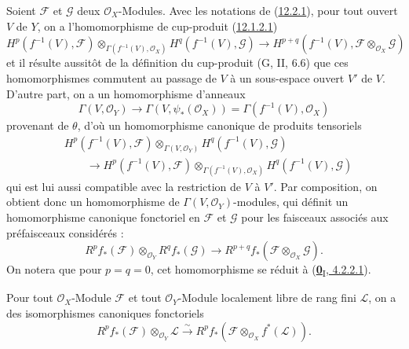\begin{env}[12.2.2]
\label{0.12.2.2-fr}
Soient $\mathcal F$ et $\mathcal G$ deux $\mathcal O_X$-Modules. Avec les
notations de (\hyperref[0.12.2.1-fr]{12.2.1}), pour tout ouvert $V$ de $Y$,
on a l'homomorphisme de cup-produit
(\hyperref[0.12.1.2.1-fr]{12.1.2.1})
\[
H^p(f^{-1}(V),\mathcal F)
\otimes_{\Gamma(f^{-1}(V),\mathcal O_X)}
H^q(f^{-1}(V),\mathcal G)
\longrightarrow
H^{p+q}(f^{-1}(V),\mathcal F\otimes_{\mathcal O_X}\mathcal G)
\]
et il résulte aussitôt de la définition du cup-produit (G, II, 6.6) que ces
homomorphismes commutent au passage de $V$ à un sous-espace ouvert $V'$ de
$V$. D'autre part, on a un homomorphisme d'anneaux
\[
\Gamma(V,\mathcal O_Y)\longrightarrow\Gamma(V,\psi_*(\mathcal O_X))
=\Gamma(f^{-1}(V),\mathcal O_X)
\]
provenant de $\theta$, d'où un homomorphisme canonique de produits tensoriels
\[
\begin{aligned}
&H^p(f^{-1}(V),\mathcal F)\otimes_{\Gamma(V,\mathcal O_Y)}
H^q(f^{-1}(V),\mathcal G)\\
&\qquad\longrightarrow
H^p(f^{-1}(V),\mathcal F)
\otimes_{\Gamma(f^{-1}(V),\mathcal O_X)}
H^q(f^{-1}(V),\mathcal G)
\end{aligned}
\]
qui est lui aussi compatible avec la restriction de $V$ à $V'$. Par
composition, on obtient donc un homomorphisme de
$\Gamma(V,\mathcal O_Y)$-modules, qui définit un homomorphisme canonique
fonctoriel en $\mathcal F$ et $\mathcal G$ pour les faisceaux associés aux
préfaisceaux considérés :
\[
\label{0.12.2.2.1-fr}
\tag{12.2.2.1}
R^p f_*(\mathcal F)\otimes_{\mathcal O_Y}R^q f_*(\mathcal G)
\longrightarrow
R^{p+q}f_*(\mathcal F\otimes_{\mathcal O_X}\mathcal G).
\]
On notera que pour $p=q=0$, cet homomorphisme se réduit à
(\hyperref[0.4.2.2.1-fr]{\textbf{0}\textsubscript{I}, 4.2.2.1}).
\end{env}

\begin{proposition}[12.2.3]
\label{0.12.2.3-fr}
Pour tout $\mathcal O_X$-Module $\mathcal F$ et tout
$\mathcal O_Y$-Module localement libre de rang fini $\mathcal L$, on a des
isomorphismes canoniques fonctoriels
\[
\label{0.12.2.3.1-fr}
\tag{12.2.3.1}
R^p f_*(\mathcal F)\otimes_{\mathcal O_Y}\mathcal L
\xrightarrow{\sim}
R^p f_*(\mathcal F\otimes_{\mathcal O_X}f^*(\mathcal L)).
\]
\end{proposition}

